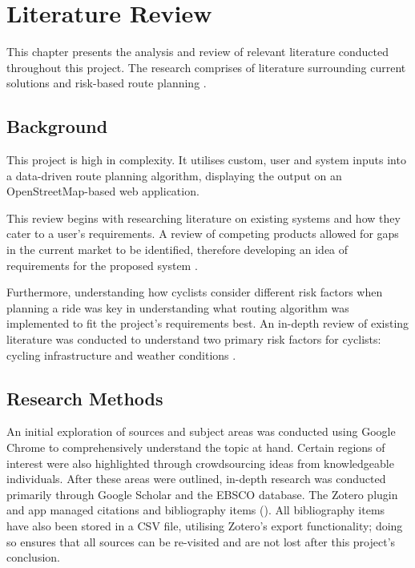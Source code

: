\chapter{Literature Review} 
\label{chap:litrev}

This chapter presents the analysis and review of relevant literature conducted throughout this project. The research comprises of literature surrounding current solutions  and risk-based route planning .

\section{Background}
\label{litrev:background}
This project is high in complexity. It utilises custom, user and system inputs into a data-driven route planning algorithm, displaying the output on an OpenStreetMap-based web application. 

This review begins with researching literature on existing systems and how they cater to a user's requirements. A review of competing products allowed for gaps in the current market to be identified, therefore developing an idea of requirements for the proposed system . 

Furthermore, understanding how cyclists consider different risk factors when planning a ride was key in understanding what routing algorithm was implemented to fit the project's requirements best. An in-depth review of existing literature was conducted to understand two primary risk factors for cyclists: cycling infrastructure  and weather conditions . 

\section{Research Methods}
\label{litrev:researchmethod}

An initial exploration of sources and subject areas was conducted using Google Chrome to comprehensively understand the topic at hand. Certain regions of interest were also highlighted through crowdsourcing ideas from knowledgeable individuals. After these areas were outlined, in-depth research was conducted primarily through Google Scholar and the EBSCO database. The Zotero plugin and app managed citations and bibliography items (\cite{noauthor_zotero_nodate}). All bibliography items have also been stored in a CSV file, utilising Zotero's export functionality; doing so ensures that all sources can be re-visited and are not lost after this project's conclusion.

